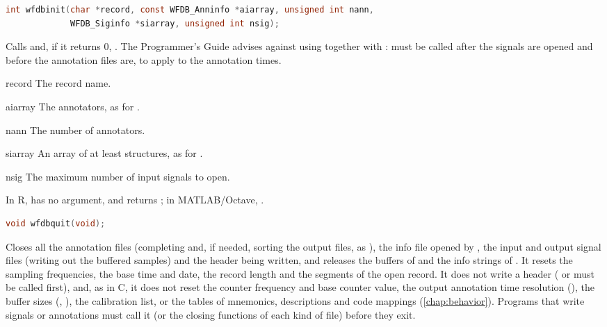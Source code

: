 \begin{lstlisting}[language=C,style=signature]
int wfdbinit(char *record, const WFDB_Anninfo *aiarray, unsigned int nann,
             WFDB_Siginfo *siarray, unsigned int nsig);
\end{lstlisting}
Calls  and, if it returns 0,
. The Programmer's Guide advises
against using  together with : 
must be called after the signals are opened and before the annotation files
are, to apply to the annotation times.
\begin{params}
\item[record] The record name.
\item[aiarray] The annotators, as for .
\item[nann] The number of annotators.
\item[siarray] An array of at least  
  structures, as for .
\item[nsig] The maximum number of input signals to open.
\end{params}

In R,  has no  argument, and
returns ; in MATLAB/Octave, .

\begin{lstlisting}[language=C,style=signature]
void wfdbquit(void);
\end{lstlisting}
Closes all the annotation files (completing and, if needed, sorting the
output files, as ), the info file opened by ,
the input and output signal files (writing out the buffered samples) and the
header being written, and releases the buffers of  and the info
strings of . It resets the sampling frequencies, the base time
and date, the record length and the segments of the open record. It does not
write a header ( or  must be called first),
and, as in C, it does not reset the counter frequency and base counter value,
the output annotation time resolution (), the buffer sizes
(, ), the calibration list, or the tables of
mnemonics, descriptions and code mappings (\cref{chap:behavior}). Programs
that write signals or annotations must call it (or the closing functions of
each kind of file) before they exit.

